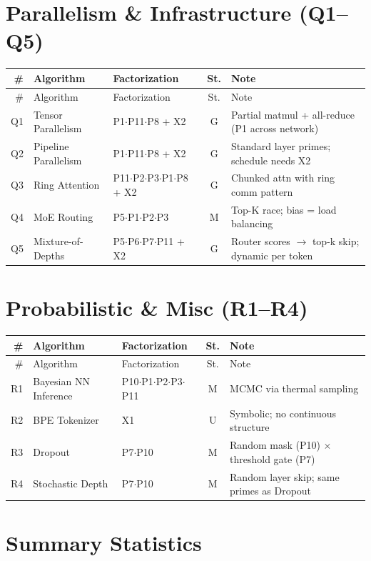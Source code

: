 \documentclass[10pt]{article}
\begin{document}
\section{Parallelism \& Infrastructure (Q1--Q5)}

\begin{longtable}{rlp{3.0cm}cp{4.8cm}}
\toprule
\# & Algorithm & Factorization & St. & Note \\
\midrule
\endfirsthead
\toprule
\# & Algorithm & Factorization & St. & Note \\
\midrule
\endhead
\bottomrule
\endfoot
Q1 & Tensor Parallelism & P1$\cdot$P11$\cdot$P8 + X2 & G & Partial matmul + all-reduce (P1 across network) \\
Q2 & Pipeline Parallelism & P1$\cdot$P11$\cdot$P8 + X2 & G & Standard layer primes; schedule needs X2 \\
Q3 & Ring Attention & P11$\cdot$P2$\cdot$P3$\cdot$P1$\cdot$P8 + X2 & G & Chunked attn with ring comm pattern \\
Q4 & MoE Routing & P5$\cdot$P1$\cdot$P2$\cdot$P3 & M & Top-K race; bias = load balancing \\
Q5 & Mixture-of-Depths & P5$\cdot$P6$\cdot$P7$\cdot$P11 + X2 & G & Router scores $\to$ top-k skip; dynamic per token \\
\end{longtable}

\section{Probabilistic \& Misc (R1--R4)}

\begin{longtable}{rlp{3.0cm}cp{4.8cm}}
\toprule
\# & Algorithm & Factorization & St. & Note \\
\midrule
\endfirsthead
\toprule
\# & Algorithm & Factorization & St. & Note \\
\midrule
\endhead
\bottomrule
\endfoot
R1 & Bayesian NN Inference & P10$\cdot$P1$\cdot$P2$\cdot$P3$\cdot$P11 & M & MCMC via thermal sampling \\
R2 & BPE Tokenizer & X1 & U & Symbolic; no continuous structure \\
R3 & Dropout & P7$\cdot$P10 & M & Random mask (P10) $\times$ threshold gate (P7) \\
R4 & Stochastic Depth & P7$\cdot$P10 & M & Random layer skip; same primes as Dropout \\
\end{longtable}

\section{Summary Statistics}
\end{document}
